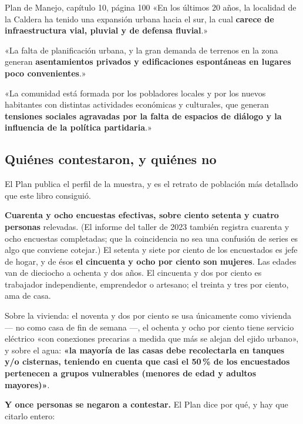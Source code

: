 \begin{ficha}{Plan de Manejo, capítulo 10, página 100}
«En los últimos 20 años, la localidad de la Caldera ha tenido una expansión urbana hacia el
sur, la cual \textbf{carece de infraestructura vial, pluvial y de defensa fluvial}.»

«La falta de planificación urbana, y la gran demanda de terrenos en la zona generan
\textbf{asentamientos privados y edificaciones espontáneas en lugares poco convenientes}.»

«La comunidad está formada por los pobladores locales y por los nuevos habitantes con
distintas actividades económicas y culturales, que generan \textbf{tensiones sociales
agravadas por la falta de espacios de diálogo y la influencia de la política partidaria}.»
\end{ficha}

\subsection*{Quiénes contestaron, y quiénes no}

El Plan publica el perfil de la muestra, y es el retrato de población más detallado que este
libro consiguió.

\textbf{Cuarenta y ocho encuestas efectivas, sobre ciento setenta y cuatro personas} relevadas. (El informe del taller de 2023 también registra cuarenta y ocho encuestas completadas; que la coincidencia no sea una confusión de series es algo que conviene cotejar.) El setenta y siete por ciento de los encuestados es jefe de hogar, y de ésos
\textbf{el cincuenta y ocho por ciento son mujeres}. Las edades van de dieciocho a ochenta y
dos años. El cincuenta y dos por ciento es trabajador independiente, emprendedor o artesano;
el treinta y tres por ciento, ama de casa.

Sobre la vivienda: el noventa y dos por ciento se usa únicamente como vivienda --- no como
casa de fin de semana ---, el ochenta y ocho por ciento tiene servicio eléctrico «con
conexiones precarias a medida que más se alejan del ejido urbano», y sobre el agua:
\textbf{«la mayoría de las casas debe recolectarla en tanques y/o cisternas, teniendo en
cuenta que casi el 50\,\% de los encuestados pertenecen a grupos vulnerables (menores de edad
y adultos mayores)»}.

\textbf{Y once personas se negaron a contestar.} El Plan dice por qué, y hay que citarlo
entero:

